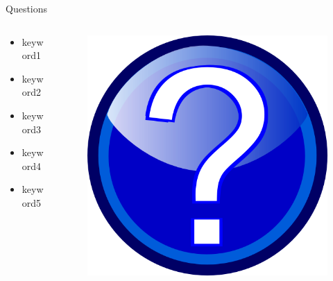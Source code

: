\documentclass{beamer}
\begin{document}
\begin{frame}{Questions}
  \begin{columns}
    \begin{column}[l]{0.5\textwidth}
      \begin{itemize}
        \item keyword1
        \item keyword2
        \item keyword3
        \item keyword4
        \item keyword5
      \end{itemize}
    \end{column}
    \begin{column}[c]{0.5\textwidth}
      \begin{figure}
        \includegraphics[scale=0.3]{img/question-mark}
      \end{figure}
    \end{column}
  \end{columns}
\end{frame}
\end{document}
